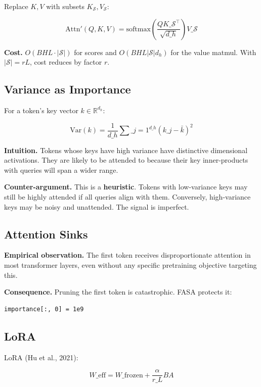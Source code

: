 Replace $K, V$ with subsets $K_{\mathcal{S}}, V_{\mathcal{S}}$:

\[
\text{Attn}'(Q, K, V) = \text{softmax}\!\left(\frac{QK\_{\mathcal{S}}^\top}{\sqrt{d\_h}}\right)V\_{\mathcal{S}}
\tag{3.2}
\]

\textbf{Cost.} $O(B H L \cdot |\mathcal{S}|)$ for scores and $O(B H L |\mathcal{S}| d_h)$ 
for the value matmul. With $|\mathcal{S}| = rL$, cost reduces by factor $r$.

\subsection{Variance as Importance}

For a token's key vector $k \in \mathbb{R}^{d_h}$:

\[
\text{Var}(k) = \frac{1}{d\_h} \sum\_{j=1}^{d\_h} (k\_j - \bar{k})^2
\tag{3.3}
\]

\textbf{Intuition.} Tokens whose keys have high variance have distinctive 
dimensional activations. They are likely to be attended to because their 
key inner-products with queries will span a wider range.

\textbf{Counter-argument.} This is a \textbf{heuristic}. Tokens with low-variance 
keys may still be highly attended if all queries align with them. Conversely, 
high-variance keys may be noisy and unattended. The signal is imperfect.

\subsection{Attention Sinks}

\textbf{Empirical observation.} The first token receives disproportionate 
attention in most transformer layers, even without any specific pretraining 
objective targeting this.

\textbf{Consequence.} Pruning the first token is catastrophic. FASA protects it:

\begin{lstlisting}
importance[:, 0] = 1e9
\end{lstlisting}

\subsection{LoRA}

LoRA (Hu et al., 2021):

\[
W\_{\text{eff}} = W\_{\text{frozen}} + \frac{\alpha}{r\_L} BA
\tag{3.4}
\]

